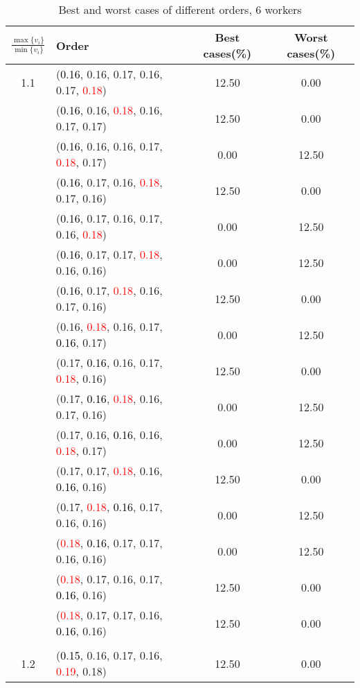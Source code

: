 \documentclass[10pt,a4paper]{report}
\begin{document}
\newpage\begin{center}
	\small
	\begin{longtable}{clcc}
		\caption{Best and worst cases of different orders, 6 workers}\\
		\toprule
		\setlength{\tabcolsep}{1mm}
		\renewcommand\baselinestretch{0.5}\selectfont
		$\frac{\max\{v_i\}}{\min\{v_i\}}$ & Order & Best cases(\%) & Worst cases(\%) \\
			\midrule		1.1			&(\textcolor{black}{0.16}, 0.16, 0.17, 0.16, 0.17, \textcolor{red}{0.18})&12.50&0.00\\
			&(\textcolor{black}{0.16}, 0.16, \textcolor{red}{0.18}, 0.16, 0.17, 0.17)&12.50&0.00\\
			&(\textcolor{black}{0.16}, 0.16, 0.16, 0.17, \textcolor{red}{0.18}, 0.17)&0.00&12.50\\
			&(\textcolor{black}{0.16}, 0.17, 0.16, \textcolor{red}{0.18}, 0.17, 0.16)&12.50&0.00\\
			&(\textcolor{black}{0.16}, 0.17, 0.16, 0.17, 0.16, \textcolor{red}{0.18})&0.00&12.50\\
			&(\textcolor{black}{0.16}, 0.17, 0.17, \textcolor{red}{0.18}, 0.16, 0.16)&0.00&12.50\\
			&(\textcolor{black}{0.16}, 0.17, \textcolor{red}{0.18}, 0.16, 0.17, 0.16)&12.50&0.00\\
			&(0.16, \textcolor{red}{0.18}, 0.16, 0.17, \textcolor{black}{0.16}, 0.17)&0.00&12.50\\
			&(0.17, \textcolor{black}{0.16}, 0.16, 0.17, \textcolor{red}{0.18}, 0.16)&12.50&0.00\\
			&(0.17, \textcolor{black}{0.16}, \textcolor{red}{0.18}, 0.16, 0.17, 0.16)&0.00&12.50\\
			&(0.17, 0.16, \textcolor{black}{0.16}, 0.16, \textcolor{red}{0.18}, 0.17)&0.00&12.50\\
			&(0.17, 0.17, \textcolor{red}{0.18}, 0.16, \textcolor{black}{0.16}, 0.16)&12.50&0.00\\
			&(0.17, \textcolor{red}{0.18}, \textcolor{black}{0.16}, 0.17, 0.16, 0.16)&0.00&12.50\\
			&(\textcolor{red}{0.18}, \textcolor{black}{0.16}, 0.17, 0.17, 0.16, 0.16)&0.00&12.50\\
			&(\textcolor{red}{0.18}, 0.17, 0.16, 0.17, \textcolor{black}{0.16}, 0.16)&12.50&0.00\\
			&(\textcolor{red}{0.18}, 0.17, 0.17, 0.16, \textcolor{black}{0.16}, 0.16)&12.50&0.00\\
		&&&\\
		1.2			&(\textcolor{black}{0.15}, 0.16, 0.17, 0.16, \textcolor{red}{0.19}, 0.18)&12.50&0.00\\

\end{longtable}
\end{center}
\end{document}
